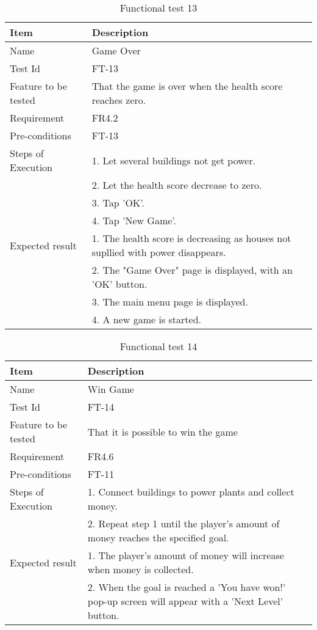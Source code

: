 \begin{table}[H]
\centering
	\begin{tabular}{ l | p{8cm} }
		\hline
		{\bf Item} & {\bf Description} \\ \hline
		Name & Game Over \\ 
		Test Id & FT-13 \\ 
		Feature to be tested & That the game is over when the health score reaches zero. \\ 
		Requirement & FR4.2 \\ 
		Pre-conditions & FT-13 \\ 
		Steps of Execution & 1. Let several buildings not get power. \\ 
		& 2. Let the health score decrease to zero. \\
		& 3. Tap 'OK'. \\
		& 4. Tap 'New Game'. \\
		Expected result & 1. The health score is decreasing as houses not supllied with power disappears. \\
		& 2. The "Game Over" page is displayed, with an 'OK' button. \\
		& 3. The main menu page is displayed. \\
		& 4. A new game is started. \\
	\end{tabular}
	\caption{Functional test 13}
\end{table}

\begin{table}[H]
\centering
	\begin{tabular}{ l | p{8cm} }
		\hline
		{\bf Item} & {\bf Description} \\ \hline
		Name & Win Game \\ 
		Test Id & FT-14 \\ 
		Feature to be tested & That it is possible to win the game \\ 
		Requirement & FR4.6 \\ 
		Pre-conditions & FT-11 \\ 
		Steps of Execution & 1. Connect buildings to power plants and collect money. \\ 
		& 2. Repeat step 1 until the player's amount of money reaches the specified goal. \\
		Expected result & 1. The player's amount of money will increase when money is collected. \\ 
		& 2. When the goal is reached a 'You have won!' pop-up screen will appear with a 'Next Level' button. \\
	\end{tabular}
	\caption{Functional test 14}
\end{table}

